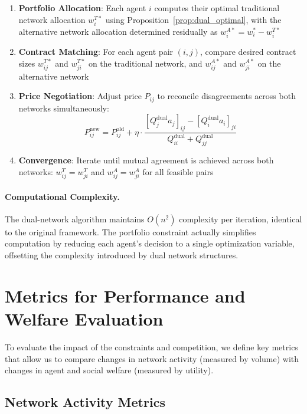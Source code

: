 \begin{enumerate}
    \item \textbf{Portfolio Allocation}: Each agent $i$ computes their optimal traditional network allocation $w_i^{T*}$ using Proposition~\ref{prop:dual_optimal}, with the alternative network allocation determined residually as $w_i^{A*} = w_i^* - w_i^{T*}$
    
    \item \textbf{Contract Matching}: For each agent pair $(i,j)$, compare desired contract sizes $w_{ij}^{T*}$ and $w_{ji}^{T*}$ on the traditional network, and $w_{ij}^{A*}$ and $w_{ji}^{A*}$ on the alternative network
    
    \item \textbf{Price Negotiation}: Adjust price $P_{ij}$ to reconcile disagreements across both networks simultaneously:
    \begin{equation}
    P_{ij}^{\text{new}} = P_{ij}^{\text{old}} + \eta \cdot \frac{[Q_j^{\text{dual}} a_j]_{ij} - [Q_i^{\text{dual}} a_i]_{ji}}{Q_{ii}^{\text{dual}} + Q_{jj}^{\text{dual}}}
    \end{equation}
    
    \item \textbf{Convergence}: Iterate until mutual agreement is achieved across both networks: $w_{ij}^T = w_{ji}^T$ and $w_{ij}^A = w_{ji}^A$ for all feasible pairs
\end{enumerate}

\paragraph{Computational Complexity.} The dual-network algorithm maintains $O(n^2)$ complexity per iteration, identical to the original framework. The portfolio constraint actually simplifies computation by reducing each agent's decision to a single optimization variable, offsetting the complexity introduced by dual network structures.

\section{Metrics for Performance and Welfare Evaluation}
\label{sec:metrics}

To evaluate the impact of the constraints and competition, we define key metrics that allow us to compare changes in network activity (measured by volume) with changes in agent and social welfare (measured by utility). 

\subsection{Network Activity Metrics}


